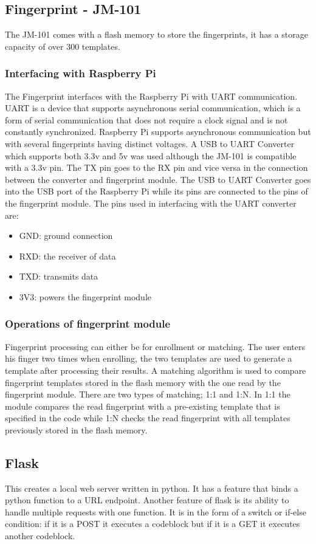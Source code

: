 \subsection{Fingerprint - JM-101}
The JM-101 comes with a flash memory to store the fingerprints, it has a storage capacity of over 300 templates.
\subsubsection{Interfacing with Raspberry Pi}
The Fingerprint interfaces with the Raspberry Pi with \gls{UART} communication. \gls{UART} is a device that supports asynchronous serial communication, which is a form of serial communication that does not require a clock signal and is not constantly synchronized. Raspberry Pi supports asynchronous communication but with several fingerprints having distinct voltages. A USB to \gls{UART} Converter which supports both 3.3v and 5v was used although the JM-101 is compatible with a 3.3v pin. The TX pin goes to the RX pin and vice versa in the connection between the converter and fingerprint module. The USB to \gls{UART} Converter goes into the USB port of the Raspberry Pi while its pins are connected to the pins of the fingerprint module.
The pins used in interfacing with the \gls{UART} converter are:
\begin{itemize}
\item GND: ground connection
\item RXD: the receiver of data
\item TXD: transmits data
\item 3V3: powers the fingerprint module
\end{itemize}
\subsubsection{Operations of fingerprint module}
Fingerprint processing can either be for enrollment or matching. The user enters his finger two times when enrolling, the two templates are used to generate a template after processing their results.
A matching algorithm is used to compare fingerprint templates stored in the flash memory with the one read by the fingerprint module. There are two types of matching; 1:1 and 1:N. In 1:1 the module compares the read fingerprint with a pre-existing template that is specified in the code while \label{fingerprint 1:N}1:N checks the read fingerprint with all templates previously stored in the flash memory.
\subsection{Flask}
This creates a local web server written in python. It has a feature that binds a python function to a \gls{URL} endpoint. Another feature of flask is its ability to handle multiple requests with one function. It is in the form of a switch or if-else condition: if it is a POST it executes a codeblock but if it is a GET it executes another codeblock.
